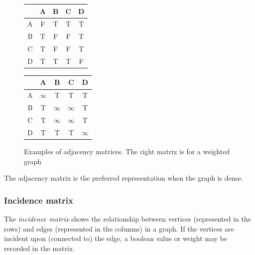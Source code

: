 \documentclass{article}
\begin{document}
\begin{figure}[H]
  \centering
  \begin{tabular}{|c|c|c|c|c|}
    \hline
    \  & A & B & C & D \\ [0.5ex] 
    \hline
    A  & F & T & T & T \\ 
    \hline
    B  & T & F & F & T \\
    \hline
    C  & T & F & F & T \\
    \hline
    D  & T & T & T & F \\
    \hline
  \end{tabular}
  \quad
  \begin{tabular}{|c|c|c|c|c|}
    \hline
    \  & A & B & C & D \\ [0.5ex] 
    \hline
    A  & \(\infty\) & T & T & T \\ 
    \hline
    B  & T & \(\infty\) & \(\infty\) & T \\
    \hline
    C  & T & \(\infty\) & \(\infty\) & T \\
    \hline
    D  & T & T & T & \(\infty\) \\
    \hline
  \end{tabular}
  \caption{Examples of adjacency matrices. The right matrix is for a weighted graph}
\end{figure}

The adjacency matrix is the preferred representation when the graph is dense.

\subsubsection{Incidence matrix}
The {\em incidence matrix} shows the relationship between vertices (represented in the rows) and edges
(represented in the columns) in a graph. If the vertices are incident upon (connected to) the edge, a boolean
value or weight may be recorded in the matrix.
\end{document}
